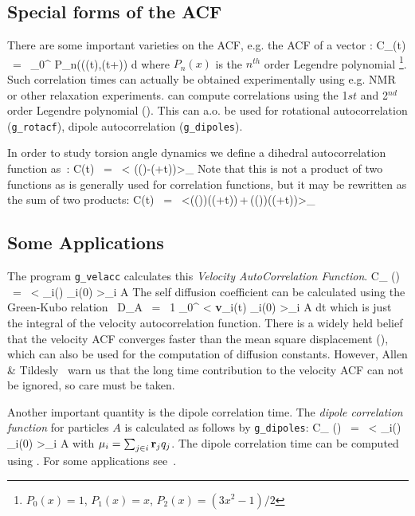 \subsection{Special forms of the ACF}
There are some important varieties on the ACF, e.g. the ACF of a vector :
\beq
C_{}(t) ~=~	\int_0^{\infty} P_n(\cos\angle\left((t),(t+\xi)\right) {\rm d} \xi
\label{eqn:corrleg}
\eeq
where $P_n(x)$ is the $n^{th}$ order Legendre polynomial
\footnote{$P_0(x) = 1$, $P_1(x) = x$, $P_2(x) = (3x^2-1)/2$}.
Such correlation times 
can actually be obtained experimentally using e.g. NMR or other relaxation 
experiments. {\gromacs} can compute correlations using 
the 1${st}$ and 2$^{nd}$ order Legendre polynomial ().
This can a.o. be used for rotational autocorrelation ({\tt g\_rotacf}), 
dipole autocorrelation ({\tt g\_dipoles}).

In order to study torsion angle dynamics we define a dihedral 
autocorrelation function as~\cite{Spoel97a}:
\beq
C(t)	~=~	\left< \cos(\theta(\tau)-\theta(\tau+t))\right>_{\tau}
\label{eqn:coenk}
\eeq
Note that this is not a  product of two functions 
as is generally used for correlation
functions, but it may be rewritten as the sum of two products:
\beq
C(t)	~=~	\left<\cos(\theta(\tau))\cos(\theta(\tau+t))\,+\,\sin(\theta(\tau))\sin(\theta(\tau+t))\right>_{\tau}
\label{eqn:cot}
\eeq

\subsection{Some Applications}
The program {\tt g\_velacc} calculates this {\em Velocity AutoCorrelation 
Function}.
\beq
C_{} (\tau) ~=~ < {}_i(\tau) _i(0) >_{i \in A}
\eeq
The self diffusion coefficient can be calculated using the Green-Kubo 
relation~\cite{Allen87}
\beq
D_A ~=~ {1} \int_0^{\infty} < {\bf v}_i(t) _i(0) >_{i \in A} \; dt
\eeq
which is just the integral of the velocity autocorrelation function.
There is a widely held belief that the velocity ACF converges faster than the mean
square displacement (), which can also be used for the computation of 
diffusion constants. However, Allen \& Tildesly~\cite{Allen87} 
warn us that the long time 
contribution to the velocity ACF can not be ignored, so care must be taken.

Another important quantity is the dipole correlation time. The {\em dipole 
correlation function} for particles $A$ is calculated as follows by 
{\tt g\_dipoles}:
\beq
C_{\mu} (\tau) ~=~ < {\bf \mu}_i(\tau) \cdot {\bf \mu}_i(0) >_{i \in A}
\eeq
with ${\bf \mu}_i = \sum_{j \in i} {\bf r}_j q_j$. The dipole correlation time 
can be computed using .
For some applications see~\cite{Spoel98a}.


